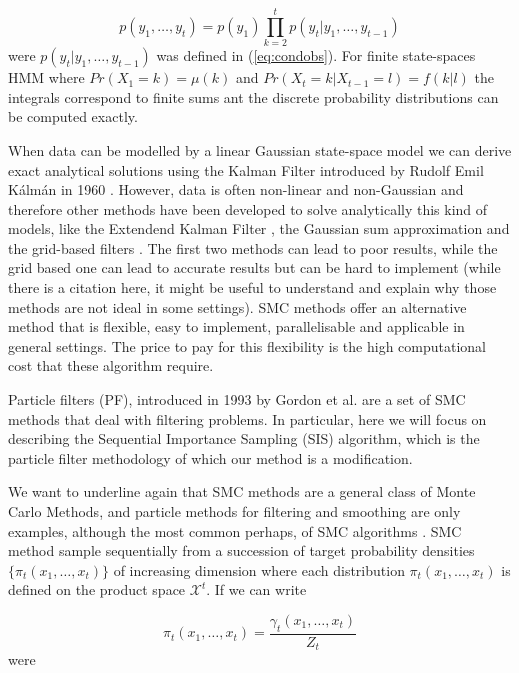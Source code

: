 \documentclass[11pt,a4paper]{article}
\begin{document}
\begin{equation*}
    p(y_1, \dots, y_t) = p(y_1)\prod_{k=2}^t p(y_t | y_1, \dots, y_{t-1})
\end{equation*}
were $p(y_t | y_1, \dots, y_{t-1})$ was defined in (\ref{eq:condobs}).
For finite state-spaces HMM where $Pr(X_1 = k) = \mu(k)$ and $Pr(X_t = k | X_{t-1} = l) = f(k|l)$ the integrals correspond to finite sums ant the discrete probability distributions can be computed exactly. 

When data can be modelled by a linear Gaussian state-space model we can derive exact analytical solutions using the Kalman Filter introduced by Rudolf Emil K\'alm\'an in 1960 \cite{Kalman}. However, data is often non-linear and non-Gaussian and therefore other methods have been developed to solve analytically this kind of models, like the Extendend Kalman Filter \cite{Anderson} \cite{Jazwinski}, the Gaussian sum approximation \cite{Soreson} and the grid-based filters \cite{Bucy}. The first two methods can lead to poor results, while the grid based one can lead to accurate results but can be hard to implement (while there is a citation here, it might be useful to understand and explain why those methods are not ideal in some settings). SMC methods offer an alternative method that is flexible, easy to implement, parallelisable and applicable in general settings\cite{DoucetBook}. The price to pay for this flexibility is the high computational cost that these algorithm require.

Particle filters (PF), introduced in 1993 by Gordon et al. \cite{Gordon} are a set of SMC methods that deal with filtering problems. In particular, here we will focus on describing the Sequential Importance Sampling (SIS) algorithm, which is the particle filter methodology of which our method is a modification.

We want to underline again that SMC methods are a general class of Monte Carlo Methods, and particle methods for filtering and smoothing are only examples, although the most common perhaps, of SMC algorithms \cite{DoucetTutorial}. SMC method sample sequentially from a succession of target probability densities $\{ \pi_t(x_1, \dots, x_t) \}$ of increasing dimension where each distribution $\pi_t(x_1, \dots, x_t)$ is defined on the product space $\mathcal{X}^t$. If we can write

\begin{equation*}
    \pi_t(x_1, \dots, x_t) = \frac{\gamma_t(x_1, \dots, x_t)}{Z_t}
\end{equation*}
were
\end{document}
